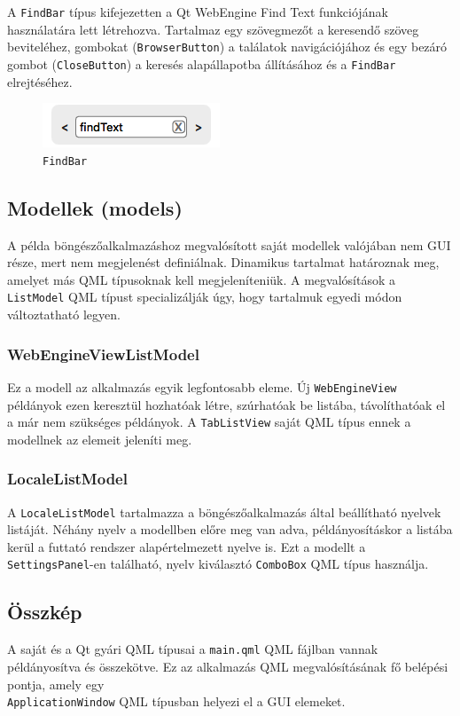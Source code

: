 \documentclass[12pt]{report}
\begin{document}
A \texttt{FindBar} típus kifejezetten a Qt WebEngine Find Text funkciójának használatára
lett létrehozva. Tartalmaz egy szövegmezőt a keresendő szöveg beviteléhez, gombokat
(\texttt{BrowserButton}) a találatok navigációjához és egy bezáró gombot
(\texttt{CloseButton}) a keresés alapállapotba állításához és a \texttt{FindBar}
elrejtéséhez.
\begin{figure}[H]
    \centering
    \includegraphics[scale=0.8]{FindBar}
    \caption{
        \label{fig:find-bar}
        \texttt{FindBar}
    }
\end{figure}

\subsection{Modellek (models)}
A példa böngészőalkalmazáshoz megvalósított saját modellek valójában nem GUI része, mert
nem megjelenést definiálnak. Dinamikus tartalmat határoznak meg, amelyet más QML típusoknak
kell megjeleníteniük. A megvalósítások a \texttt{ListModel} QML típust specializálják úgy,
hogy tartalmuk egyedi módon változtatható legyen.

\subsubsection{WebEngineViewListModel}
Ez a modell az alkalmazás egyik legfontosabb eleme. Új \texttt{WebEngineView} példányok
ezen keresztül hozhatóak létre, szúrhatóak be listába, távolíthatóak el a már nem
szükséges példányok. A \texttt{TabListView} saját QML típus ennek a modellnek az elemeit
jeleníti meg.

\subsubsection{LocaleListModel}
A \texttt{LocaleListModel} tartalmazza a böngészőalkalmazás által beállítható nyelvek
listáját. Néhány nyelv a modellben előre meg van adva, példányosításkor a listába
kerül a futtató rendszer alapértelmezett nyelve is. Ezt a modellt a
\texttt{SettingsPanel}-en található, nyelv kiválasztó \texttt{ComboBox} QML típus használja.

\subsection{Összkép}
A saját és a Qt gyári QML típusai a \texttt{main.qml} QML fájlban vannak példányosítva és
összekötve. Ez az alkalmazás QML megvalósításának fő belépési pontja, amely egy \\
\texttt{ApplicationWindow} QML típusban helyezi el a GUI elemeket.
\end{document}
